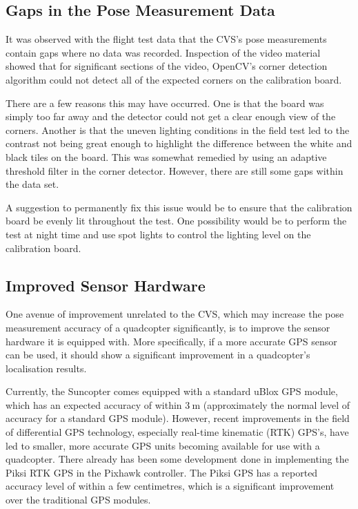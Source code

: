 \subsection{Gaps in the Pose Measurement Data}

It was observed with the flight test data that the CVS's pose measurements contain gaps where no data was recorded. Inspection of the video material showed that for significant sections of the video, OpenCV's corner detection algorithm could not detect all of the expected corners on the calibration board. 

There are a few reasons this may have occurred. One is that the board was simply too far away and the detector could not get a clear enough view of the corners. Another is that the uneven lighting conditions in the field test led to the contrast not being great enough to highlight the difference between the white and black tiles on the board. This was somewhat remedied by using an adaptive threshold filter in the corner detector. However, there are still some gaps within the data set. 

A suggestion to permanently fix this issue would be to ensure that the calibration board be evenly lit throughout the test. One possibility would be to perform the test at night time and use spot lights to control the lighting level on the calibration board. 

\subsection{Improved Sensor Hardware}

One avenue of improvement unrelated to the CVS, which may increase the pose measurement accuracy of a quadcopter significantly, is to improve the sensor hardware it is equipped with. More specifically, if a more accurate GPS sensor can be used, it should show a significant improvement in a quadcopter's localisation results. 

Currently, the Suncopter comes equipped with a standard uBlox GPS module, which has an expected accuracy of within $\SI{3}{\m}$ (approximately the normal level of accuracy for a standard GPS module). However, recent improvements in the field of differential GPS technology, especially real-time kinematic (RTK) GPS's, have led to smaller, more accurate GPS units becoming available for use with a quadcopter. There already has been some development done in implementing the Piksi RTK GPS in the Pixhawk controller. The Piksi GPS has a reported accuracy level of within a few centimetres, which is a significant improvement over the traditional GPS modules. 

